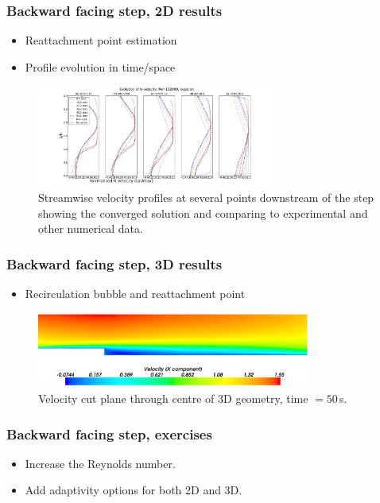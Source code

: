 %
\begin{frame}
    \frametitle{Backward facing step, 2D results}
\begin{itemize}
\item Reattachment point estimation
\item Profile evolution in time/space
\end{itemize}
\begin{figure}
\centering
\includegraphics[width=0.7\textwidth]{./backward_facing_step/velocity_profiles_kim_kepsilon}
\caption{Streamwise velocity profiles at several points downstream of the step showing the converged solution and comparing to experimental and other numerical data.}
\end{figure}

\end{frame}
%
\begin{frame}
    \frametitle{Backward facing step, 3D results}
\begin{itemize}
\item Recirculation bubble and reattachment point
\end{itemize}

\begin{figure}
\centering
\includegraphics[width=0.8\textwidth]{./backward_facing_step/velo-magnitude-3d-50sec}
\caption{Velocity cut plane through centre of 3D geometry, time $=50\,$s.}
\end{figure}

\end{frame}
%
\begin{frame}
    \frametitle{Backward facing step, exercises}
\begin{itemize}
\item Increase the Reynolds number.
\item Add adaptivity options for both 2D and 3D.
\end{itemize}

\end{frame}
